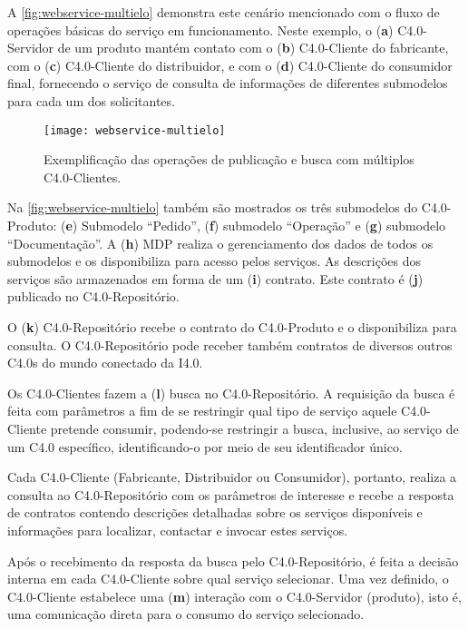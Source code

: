 A \autoref{fig:webservice-multielo} demonstra este cenário mencionado com o fluxo de operações básicas do serviço em funcionamento. Neste exemplo, o (\textbf{a}) C4.0-Servidor de um produto mantém contato com o (\textbf{b}) C4.0-Cliente do fabricante, com o (\textbf{c}) C4.0-Cliente do distribuidor, e com o (\textbf{d}) C4.0-Cliente do consumidor final, fornecendo o serviço de consulta de informações de diferentes submodelos para cada um dos solicitantes.

\begin{figure}[htb]
	\centering
	\texttt{[image: webservice-multielo]}
	\caption{Exemplificação das operações de publicação e busca com múltiplos C4.0-Clientes.}
	\label{fig:webservice-multielo}
\end{figure}

Na \autoref{fig:webservice-multielo} também são mostrados os três submodelos do C4.0-Produto: (\textbf{e}) Submodelo ``Pedido'', (\textbf{f}) submodelo ``Operação'' e (\textbf{g}) submodelo ``Documentação''. A (\textbf{h}) MDP realiza o gerenciamento dos dados de todos os submodelos e os disponibiliza para acesso pelos serviços. As descrições dos serviços são armazenados em forma de um (\textbf{i}) contrato. Este contrato é (\textbf{j}) publicado no C4.0-Repositório.

O (\textbf{k}) C4.0-Repositório recebe o contrato do C4.0-Produto e o disponibiliza para consulta. O C4.0-Repositório pode receber também contratos de diversos outros C4.0s do mundo conectado da I4.0.

Os C4.0-Clientes fazem a (\textbf{l}) busca no C4.0-Repositório. A requisição da busca é feita com parâmetros a fim de se restringir qual tipo de serviço aquele C4.0-Cliente pretende consumir, podendo-se restringir a busca, inclusive, ao serviço de um C4.0 específico, identificando-o por meio de seu identificador único.

Cada C4.0-Cliente (Fabricante, Distribuidor ou Consumidor), portanto, realiza a consulta ao C4.0-Repositório com os parâmetros de interesse e recebe a resposta de contratos contendo descrições detalhadas sobre os serviços disponíveis e informações para localizar, contactar e invocar estes serviços.

Após o recebimento da resposta da busca pelo C4.0-Repositório, é feita a decisão interna em cada C4.0-Cliente sobre qual serviço selecionar. Uma vez definido, o C4.0-Cliente estabelece uma (\textbf{m}) interação com o C4.0-Servidor (produto), isto é, uma comunicação direta para o consumo do serviço selecionado.

